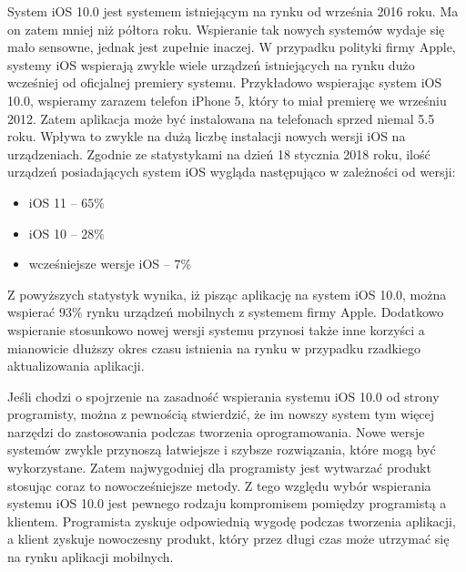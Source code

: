 \documentclass[twoside]{projektInzynierskiMS}
\begin{document}
System iOS 10.0 jest systemem istniejącym na rynku od września 2016 roku. Ma on zatem mniej niż półtora roku. Wspieranie tak nowych systemów wydaje się mało sensowne, jednak jest zupełnie inaczej. W przypadku polityki firmy Apple, systemy iOS wspierają zwykle wiele urządzeń istniejących na rynku dużo wcześniej od oficjalnej premiery systemu. Przykładowo wspierając system iOS 10.0, wspieramy zarazem telefon iPhone 5, który to miał premierę we wrześniu 2012. Zatem aplikacja może być instalowana na telefonach sprzed niemal 5.5 roku. Wpływa to zwykle na dużą liczbę instalacji nowych wersji iOS na urządzeniach. Zgodnie ze statystykami \cite{iosStatistics} na dzień 18 stycznia 2018 roku, ilość urządzeń posiadających system iOS wygląda następująco w zależności od wersji:
\begin{itemize}
\item iOS 11 -- $65\%$
\item iOS 10 -- $28\%$
\item wcześniejsze wersje iOS -- $7\%$
\end{itemize}

Z powyższych statystyk wynika, iż pisząc aplikację na system iOS 10.0, można wspierać $93\%$ rynku urządzeń mobilnych z systemem firmy Apple. Dodatkowo wspieranie stosunkowo nowej wersji systemu przynosi także inne korzyści a mianowicie dłuższy okres czasu istnienia na rynku w przypadku rzadkiego aktualizowania aplikacji.

Jeśli chodzi o spojrzenie na zasadność wspierania systemu iOS 10.0 od strony programisty, można z pewnością stwierdzić, że im nowszy system tym więcej narzędzi do zastosowania podczas tworzenia oprogramowania. Nowe wersje systemów zwykle przynoszą łatwiejsze i szybsze rozwiązania, które mogą być wykorzystane. Zatem najwygodniej dla programisty jest wytwarzać produkt stosując coraz to nowocześniejsze metody. Z tego względu wybór wspierania systemu iOS 10.0 jest pewnego rodzaju kompromisem pomiędzy programistą a klientem. Programista zyskuje odpowiednią wygodę podczas tworzenia aplikacji, a klient zyskuje nowoczesny produkt, który przez długi czas może utrzymać się na rynku aplikacji mobilnych.
\end{document}
